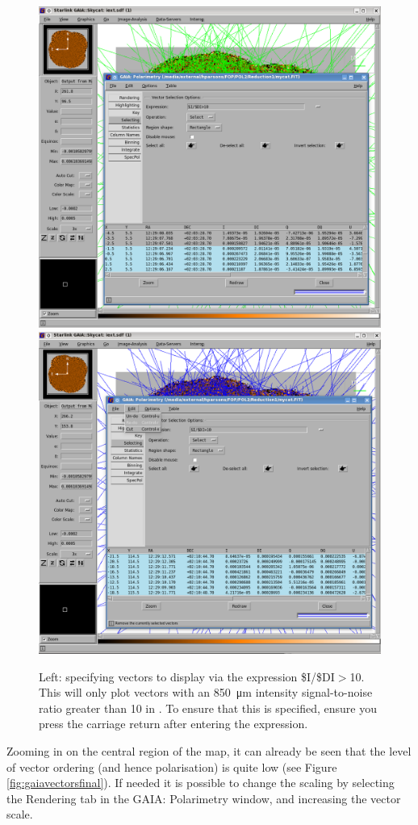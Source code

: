 \begin{figure}[t!]
\begin{center}
\includegraphics[width=0.46\linewidth]{sc22-gaia-plot-vectors-4.png}
\includegraphics[width=0.46\linewidth]{sc22-gaia-plot-vectors-6.png}
\caption [Selecting Vectors in GAIA]{Left: specifying vectors
  to display via the expression \$I/\$DI$>$10. This will only plot
  vectors with an \SI{850}{\micro\metre} intensity signal-to-noise
  ratio greater than 10 in \GAIA. To ensure that this is specified,
  ensure you press the carriage return after entering the expression.
}
\label{fig:gaiavectorssecond}
\end{center}
\end{figure}

Zooming in on the central region of the map, it can already be seen
that the level of vector ordering (and hence polarisation) is quite
low (see Figure \ref{fig:gaiavectorsfinal}). If needed it is
possible to change the scaling by selecting the Rendering tab in the
GAIA: Polarimetry window, and increasing the vector scale.


